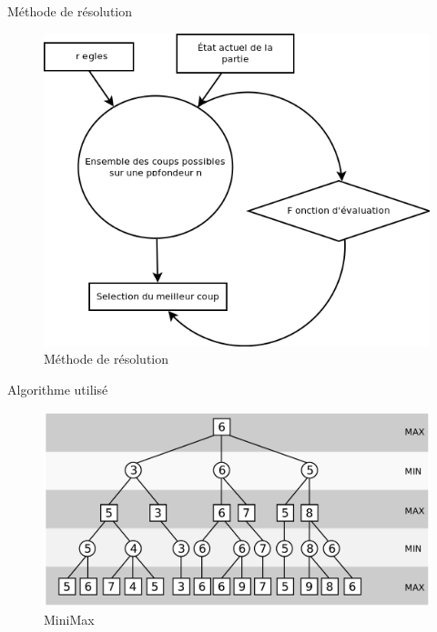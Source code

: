 \documentclass[compress, 12pt]{beamer}
\begin{document}
\begin{frame}{Méthode de résolution}
  \begin{figure}
    \includegraphics[height=0.7\textheight]{./pix/methode}
    \centering
    \caption{Méthode de résolution}
  \end{figure}
\end{frame}


\begin{frame}{Algorithme utilisé}
  \begin{figure}
    \includegraphics[width=\textwidth]{pix/minimax}
    \centering
    \caption{MiniMax}
  \end{figure}
\end{frame}
\end{document}
